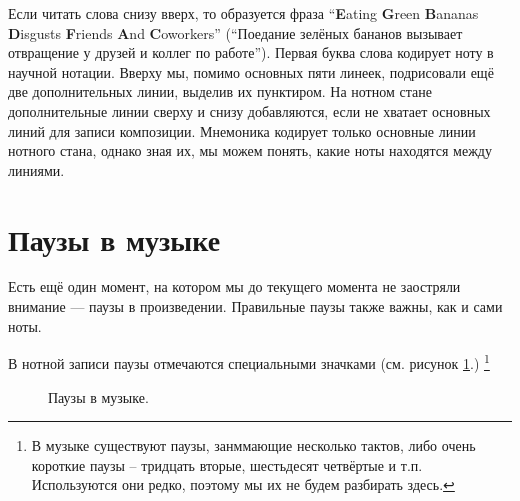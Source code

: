 \documentclass[a4paper,twoside]{book}
\begin{document}
Если читать слова снизу вверх, то образуется фраза ``\textbf{E}ating
\textbf{G}reen \textbf{B}ananas \textbf{D}isgusts \textbf{F}riends \textbf{A}nd
\textbf{C}oworkers'' (``Поедание зелёных бананов вызывает отвращение у друзей и
коллег по работе''). Первая буква слова кодирует ноту в научной нотации. Вверху
мы, помимо основных пяти линеек, подрисовали ещё две дополнительных линии,
выделив их пунктиром. На нотном стане дополнительные линии сверху и снизу
добавляются, если не хватает основных линий для записи композиции. Мнемоника
кодирует только основные линии нотного стана, однако зная их, мы можем понять,
какие ноты находятся между линиями.

\section{Паузы в музыке}

Есть ещё один момент, на котором мы до текущего момента не заостряли внимание ---
паузы в произведении. Правильные паузы также важны, как и сами ноты.

В нотной записи паузы отмечаются специальными значками (см. рисунок
\ref{fig:lilypond-rest-example-1}.) \footnote{В музыке существуют паузы,
занммающие несколько тактов, либо очень короткие паузы -- тридцать вторые,
шестьдесят четвёртые и т.п. Используются они редко, поэтому мы их не будем
разбирать здесь.}

\begin{figure}[ht]
  \caption{Паузы в музыке.}
  \centering
  \label{fig:lilypond-rest-example-1}
\end{figure}
\end{document}
